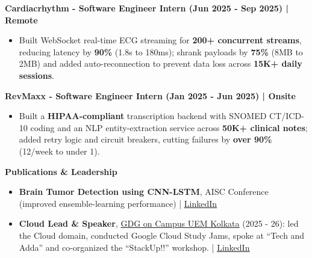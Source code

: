 \documentclass[10pt,a4paper]{article}
\newcommand{\heading}[1]{{\carlito #1}}
\newcommand{\cvsection}[1]{%
  \par\vspace{7pt}%
  {\heading{\color{sectioncolor}\large\bfseries #1}}\par\vspace{1pt}}
\newcommand{\cvsubsection}[1]{%
  \par\vspace{4pt}%
  {\heading{\color{subcolor}\bfseries #1}}\par}
\newcommand{\contactlink}[2]{\href{#1}{\color{sectioncolor}\underline{#2}}}
\newcommand{\cvrole}[4]{\cvsubsection{#1 - #2 (#3) | #4}}
\begin{document}
\cvrole{Cardiacrhythm}{Software Engineer Intern}{Jun 2025 - Sep 2025}{Remote}
\begin{itemize}
  \item Built WebSocket real-time ECG streaming for \textbf{200+ concurrent streams}, reducing latency by \textbf{90\%} (1.8s to 180ms);
        shrank payloads by \textbf{75\%} (8MB to 2MB) and added auto-reconnection to prevent data loss across \textbf{15K+ daily sessions}.
\end{itemize}

\cvrole{RevMaxx}{Software Engineer Intern}{Jan 2025 - Jun 2025}{Onsite}
\begin{itemize}
  \item Built a \textbf{HIPAA-compliant} transcription backend with SNOMED CT/ICD-10 coding and an NLP entity-extraction service
        across \textbf{50K+ clinical notes}; added retry logic and circuit breakers, cutting failures by \textbf{over 90\%} (12/week to under 1).
\end{itemize}

\cvsection{Publications \& Leadership}
\begin{itemize}
  \item \textbf{Brain Tumor Detection using CNN-LSTM}, AISC Conference (improved ensemble-learning performance) | \contactlink{https://www.linkedin.com/in/soumikadas/overlay/1768775586821/single-media-viewer/?profileId=ACoAADjotgUBcxQ5xZJAVK0yId5IZyYXuEPqmJo}{LinkedIn}
  \item \textbf{Cloud Lead \& Speaker},
        \href{https://gdg.community.dev/gdg-on-campus-university-of-engineering-management-kolkata-india/}{GDG on Campus UEM Kolkata}
        (2025 - 26): led the Cloud domain, conducted Google Cloud Study Jams, spoke at ``Tech and Adda''
        and co-organized the ``StackUp!!'' workshop. | \contactlink{https://www.linkedin.com/feed/update/urn:li:activity:7462911880844681216/}{LinkedIn}
\end{itemize}
\end{document}
